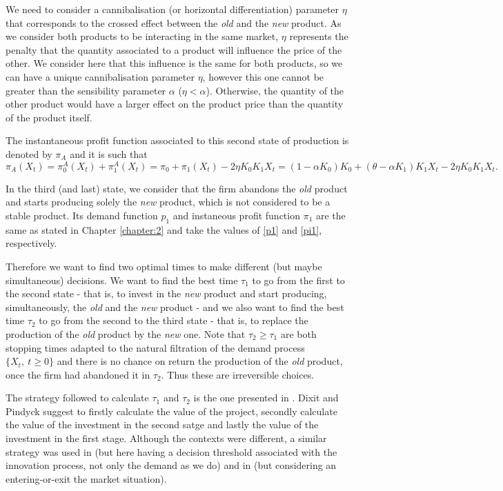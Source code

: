 We need to consider a cannibalisation (or horizontal differentiation) parameter $\eta$ that corresponds to the crossed effect between the \textit{old} and the \textit{new} product. As we consider both products to be interacting in the same market, $\eta$ represents the penalty that the quantity
associated to a product will influence the price of the other. We consider here
that this influence is the same for both products, so we can have a unique cannibalisation parameter $\eta$, however this one cannot be greater than the sensibility parameter $\alpha$ ($\eta<\alpha$). Otherwise, the quantity
of the other product would have a larger effect on the product price than the quantity of the product itself.

The instantaneous profit function associated to this second state of production is denoted by $\pi_A$ and it is such that
\begin{equation}
\pi_A(X_t)=\pi_0^A(X_t)+\pi_1^A(X_t)= \pi_0+\pi_1(X_t)-2\eta K_0 K_1 X_t=(1-\alpha K_0)K_0+(\theta-\alpha K_1)K_1X_t-2\eta K_0 K_1 X_t.
\end{equation}


In the third (and last) state, we consider that the firm abandons the \textit{old} product and starts producing solely the \textit{new} product, which is not considered to be a stable product. Its demand function $p_1$ and instaneous profit function $\pi_1$ are the same as stated in Chapter \ref{chapter:2} and take the values of \eqref{p1} and \eqref{pi1}, respectively.


Therefore we want to find two optimal times to make different (but maybe simultaneous) decisions. We want to find the best time $\tau_1$ to go from the first to the second state - that is, to invest in the \textit{new} product and start producing, simultaneously, the \textit{old} and the \textit{new} product - and we also want to find the best time $\tau_2$ to go from the second to the third state - that is, to replace the production of the \textit{old} product by the \textit{new} one. Note that $\tau_2 \geq \tau_1$ are both stopping times adapted to the natural filtration of the demand process $\{ X_t, \ t\geq0 \}$ and there is no chance on return the production of the \textit{old} product, once the firm had abandoned it in $\tau_2$. Thus these are irreversible choices. 

The strategy followed to calculate $\tau_1$ and $\tau_2$ is the one presented in \cite{dixit:book}. Dixit and Pindyck suggest to firstly calculate the value of the project, secondly calculate the value of the investment in the second satge and lastly the value of the investment in the first stage. Although the contexts were different, a similar strategy was used in \cite{rita} (but here having a decision threshold associated with the innovation process, not only the demand as we do) and in \cite{hagspiel:cap} (but considering an entering-or-exit the market situation).

